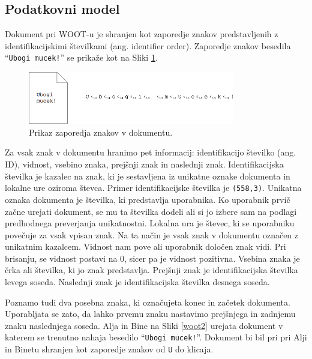 \documentclass[a4paper, 12pt, twoside]{book}
\begin{document}
\subsection{Podatkovni model}
\label{subsec:pm}

Dokument pri WOOT-u je shranjen kot zaporedje znakov predstavljenih z identifikacijskimi številkami (ang. identifier order). Zaporedje znakov besedila “{\tt Ubogi mucek!}” se prikaže kot na Sliki \ref{woot1}.

\begin{figure}[placement h]
\begin{center}
\includegraphics[width=9cm]{woot1.png}
\end{center}
\caption{Prikaz zaporedja znakov v dokumentu.}
\label{woot1}
\end{figure}

Za vsak znak v dokumentu hranimo pet informacij: identifikacijo številko (ang. ID), vidnost, vsebino znaka, prejšnji znak in naslednji znak. Identifikacijska številka je kazalec na znak, ki je sestavljena iz unikatne oznake dokumenta in lokalne ure oziroma števca. Primer identifikacijske številka je {\tt (558,3)}. Unikatna oznaka dokumenta je številka, ki predstavlja uporabnika. Ko uporabnik prvič začne urejati dokument, se mu ta številka dodeli ali si jo izbere sam na podlagi predhodnega preverjanja unikatnostni. Lokalna ura je števec, ki se uporabniku povečuje za vsak vpisan znak. Na ta način je vsak znak v dokumentu označen z unikatnim kazalcem. Vidnost nam pove ali uporabnik določen znak vidi. Pri brisanju, se vidnost postavi na 0, sicer pa je vidnost pozitivna. Vsebina znaka je črka ali številka, ki jo znak predstavlja. Prejšnji znak je identifikacijska številka levega soseda. Naslednji znak je identifikacijska številka desnega soseda.

Poznamo tudi dva posebna znaka, ki označujeta konec in začetek dokumenta. Uporabljata se zato, da lahko prvemu znaku nastavimo prejšnjega in zadnjemu znaku naslednjega soseda. Alja in Bine na Sliki \ref{woot2} urejata dokument v katerem se trenutno nahaja besedilo “{\tt Ubogi mucek!}”. Dokument bi bil pri pri Alji in Binetu shranjen kot zaporedje znakov od {\tt U} do klicaja.
\end{document}
